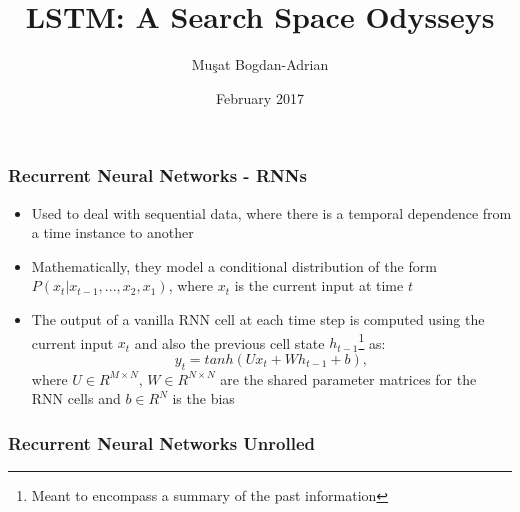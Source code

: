 \documentclass{beamer}
\title[LSTM: A Search Space Odysseys]{LSTM: A Search Space Odysseys}
\author[Mu\c sat Bogdan-Adrian]{Mu\c sat Bogdan-Adrian}
\date{February 2017}
\begin{document}
\frame{\titlepage}

\begin{frame}
\frametitle{Recurrent Neural Networks - RNNs}
\center
\begin{itemize}
	\item Used to deal with sequential data, where there is a temporal dependence from a time instance to another
	\item Mathematically, they model a conditional distribution of the form \(P(x_t \lvert x_{t-1},..., x_2, x_1) \), where \(x_t\) is the current input at time \(t\)
	\item The output of a vanilla RNN cell at each time step is computed using the current input \(x_t\) and also the previous cell state \(h_{t-1}\)\footnote{Meant to encompass a summary of the past information} as:
	\[
		y_t = tanh(Ux_t + Wh_{t-1} + b),
	\]
	where \(U \in R^{M \times N}\), \(W \in R^{N \times N}\) are the shared parameter matrices for the RNN cells and \(b \in R^N\) is the bias
\end{itemize}
\end{frame}

\begin{frame}
\frametitle{Recurrent Neural Networks Unrolled}
\begin{figure}
	\subcapcentertrue
    \centering
    \end{figure}
\end{frame}
\end{document}
